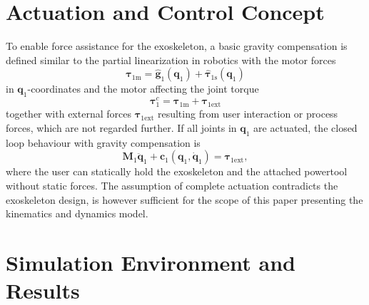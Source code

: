 \documentclass[letterpaper, 10 pt, conference]{ieeeconf}  %
\begin{document}
%

\section{Actuation and Control Concept}
\label{sec:actuation_control}

To enable force assistance for the exoskeleton, a basic gravity compensation is defined similar to the partial linearization in robotics with the motor forces
%
\begin{equation}
\bm{\tau}_{1\mathrm{m}} = \hat{\bm{g}}_1(\bm{q}_1) + \hat{\bm{\tau}}_{1\mathrm{s}}(\bm{q}_1)
\label{equ:GravKomp}
\end{equation}
%
in $\bm{q}_1$-coordinates and the motor affecting the joint torque
%
\begin{equation}
\bm{\tau}^c_1 = \bm{\tau}_{1\mathrm{m}} + \bm{\tau}_{1\mathrm{ext}}
\label{equ:JointTorque}
\end{equation}
%
together with external forces $\bm{\tau}_{1\mathrm{ext}}$ resulting from user interaction or process forces, which are not regarded further.
If all joints in $\bm{q}_1$ are actuated, the closed loop behaviour with gravity compensation is
%
\begin{equation}
\bm{M}_1\ddot{\bm{q}}_1+\bm{c}_1(\bm{q}_1,\dot{\bm{q}}_1) = \bm{\tau}_{1\mathrm{ext}},
\label{equ:closedloop}
\end{equation}
%
where the user can statically hold the exoskeleton and the attached powertool without static forces.
The assumption of complete actuation contradicts the exoskeleton design, is however sufficient for the scope of this paper presenting the kinematics and dynamics model.

\section{Simulation Environment and Results}
\label{sec:simulation}
\end{document}
